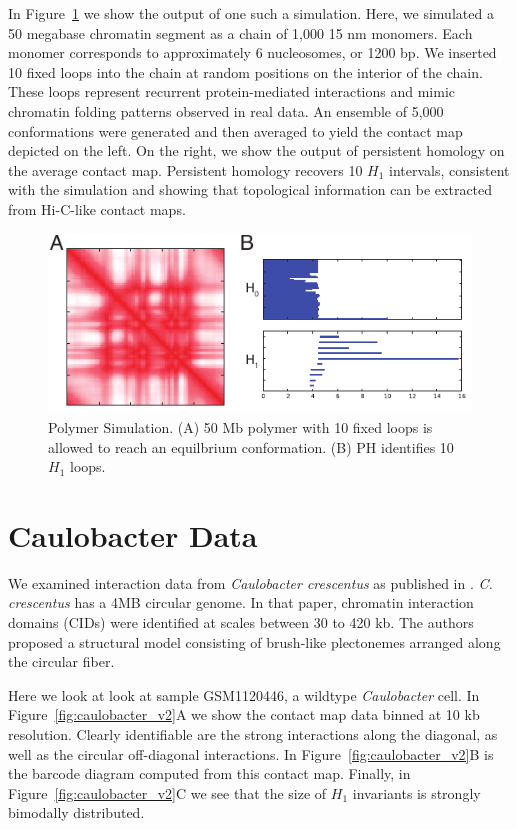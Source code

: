 In Figure~\ref{fig:polymer_sim} we show the output of one such a simulation.
Here, we simulated a 50 megabase chromatin segment as a chain of 1,000 15 nm monomers.
Each monomer corresponds to approximately 6 nucleosomes, or 1200 bp.
We inserted 10 fixed loops into the chain at random positions on the interior of the chain.
These loops represent recurrent protein-mediated interactions and mimic chromatin folding patterns observed in real data.
An ensemble of 5,000 conformations were generated and then averaged to yield the contact map depicted on the left.
On the right, we show the output of persistent homology on the average contact map.
Persistent homology recovers 10 $H_1$ intervals, consistent with the simulation and showing that topological information can be extracted from Hi-C-like contact maps.

\begin{figure}
       \centering
       \includegraphics[width=\columnwidth]{./fig/polymer_sim.pdf}
       \caption{Polymer Simulation. (A) 50 Mb polymer with 10 fixed loops is allowed to reach an equilbrium conformation. (B) PH identifies 10 $H_1$ loops.}
       \label{fig:polymer_sim}
\end{figure}

\section{Caulobacter Data}
\label{sec:caulobacter_data}
%
We examined interaction data from \emph{Caulobacter crescentus} as published in \cite{Le:2013ci}.
\emph{C. crescentus} has a 4MB circular genome.
In that paper, chromatin interaction domains (CIDs) were identified at scales between 30 to 420 kb.
The authors proposed a structural model consisting of brush-like plectonemes arranged along the circular fiber.

Here we look at look at sample GSM1120446, a wildtype \emph{Caulobacter} cell.
In Figure~\ref{fig:caulobacter_v2}A we show the contact map data binned at 10 kb resolution.
Clearly identifiable are the strong interactions along the diagonal, as well as the circular off-diagonal interactions.
In Figure~\ref{fig:caulobacter_v2}B is the barcode diagram computed from this contact map.
Finally, in Figure~\ref{fig:caulobacter_v2}C we see that the size of $H_1$ invariants is strongly bimodally distributed.

